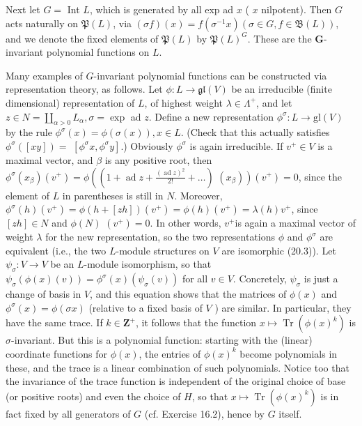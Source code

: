 \documentclass[10pt]{article}
\begin{document}
Next let $G=$ Int $L$, which is generated by all exp ad $x$ ( $x$ nilpotent). Then $G$ acts naturally on $\mathfrak{P}(L)$, via $(\sigma f)(x)=f\left(\sigma^{-1} x\right)(\sigma \in G, f \in \mathfrak{B}(L))$, and we denote the fixed elements of $\mathfrak{P}(L)$ by $\mathfrak{P}(L)^{G}$. These are the $\mathbf{G}$-invariant polynomial functions on $L$.

Many examples of $G$-invariant polynomial functions can be constructed via representation theory, as follows. Let $\phi: L \rightarrow \mathfrak{g l}(V)$ be an irreducible (finite dimensional) representation of $L$, of highest weight $\lambda \in \Lambda^{+}$, and let $z \in N=\coprod_{\alpha>0} L_{\alpha}, \sigma=\exp$ ad $z$. Define a new representation $\phi^{\sigma}: L \rightarrow \mathrm{gl}(V)$ by the rule $\phi^{\sigma}(x)=\phi(\sigma(x)), x \in L$. (Check that this actually satisfies $\phi^{\sigma}([x y])=$ $\left[\phi^{\sigma} x, \phi^{\sigma} y\right]$.) Obviously $\phi^{\sigma}$ is again irreducible. If $v^{+} \in V$ is a maximal vector, and $\beta$ is any positive root, then $\phi^{\sigma}\left(x_{\beta}\right)\left(v^{+}\right)=\phi\left(\left(1+\operatorname{ad} z+\frac{(\operatorname{ad} z)^{2}}{2!}+\ldots\right)\right.$ $\left.\left(x_{\beta}\right)\right)\left(v^{+}\right)=0$, since the element of $L$ in parentheses is still in $N$. Moreover, $\phi^{\sigma}(h)\left(v^{+}\right)=\phi(h+[z h])\left(v^{+}\right)=\phi(h)\left(v^{+}\right)=\lambda(h) v^{+}$, since $[z h] \in N$ and $\phi(N)$ $\left(v^{+}\right)=0$. In other words, $v^{+}$is again a maximal vector of weight $\lambda$ for the new representation, so the two representations $\phi$ and $\phi^{\sigma}$ are equivalent (i.e., the two $L$-module structures on $V$ are isomorphic (20.3)). Let $\psi_{\sigma}: V \rightarrow V$ be an $L$-module isomorphism, so that $\psi_{\sigma}(\phi(x)(v))=\phi^{\sigma}(x)\left(\psi_{\sigma}(v)\right)$ for all $v \in V$. Concretely, $\psi_{\sigma}$ is just a change of basis in $V$, and this equation shows that the matrices of $\phi(x)$ and $\phi^{\sigma}(x)=\phi(\sigma x)$ (relative to a fixed basis of $V$ ) are similar. In particular, they have the same trace. If $k \in \mathbf{Z}^{+}$, it follows that the function $x \mapsto \operatorname{Tr}\left(\phi(x)^{k}\right)$ is $\sigma$-invariant. But this is a polynomial function: starting with the (linear) coordinate functions for $\phi(x)$, the entries of $\phi(x)^{k}$ become polynomials in these, and the trace is a linear combination of such polynomials. Notice too that the invariance of the trace function is independent of the original choice of base (or positive roots) and even the choice of $H$, so that $x \mapsto \operatorname{Tr}\left(\phi(x)^{k}\right)$ is in fact fixed by all generators of $G$ (cf. Exercise 16.2), hence by $G$ itself.
\end{document}
